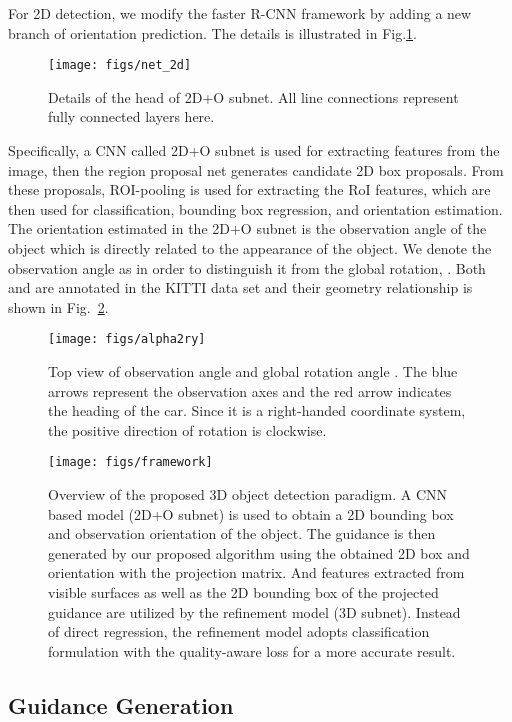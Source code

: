 \documentclass[10pt,twocolumn,letterpaper]{article}
\begin{document}
For 2D detection, we modify the faster R-CNN framework by adding a new branch of orientation prediction. 
The details is illustrated in Fig.\ref{fig:net_2d}.

\begin{figure}[!h]
\centering
\texttt{[image: figs/net\_2d]}
\caption{Details of the head of 2D+O subnet. All line connections represent fully connected layers here.}
\label{fig:net_2d}
\end{figure}

Specifically, a CNN called 2D+O subnet is used for extracting features from the image, then the region proposal net generates candidate 2D box proposals. From these proposals, ROI-pooling is used for extracting the RoI features, which are then used for classification, bounding box regression, and orientation estimation.
The orientation estimated in the 2D+O subnet is the observation angle of the object which is directly related to the appearance of the object. We denote the observation angle as  in order to distinguish it from the global rotation, . Both  and  are annotated in the KITTI data set and their geometry relationship is shown in Fig.~\ref{fig:alpha2ry}.  

\begin{figure}[!h]
\centering
\texttt{[image: figs/alpha2ry]}
\caption{Top view of observation angle  and global rotation angle . The blue arrows represent the observation axes and the red arrow indicates the heading of the car. Since it is a right-handed coordinate system, the positive direction of rotation is clockwise.}
\label{fig:alpha2ry}
\end{figure}

\begin{figure*}[!t]
\centering
\texttt{[image: figs/framework]}
\caption{Overview of the proposed 3D object detection paradigm. A CNN based model (2D+O subnet) is used to obtain a 2D bounding box and observation orientation of the object. The guidance is then generated by our proposed algorithm using the obtained 2D box and orientation with the projection matrix. And features extracted from visible surfaces as well as the 2D bounding box of the projected guidance are utilized by the refinement model (3D subnet). Instead of direct regression, the refinement model adopts classification formulation with the quality-aware loss for a more accurate result.}
\label{fig:framework}
\end{figure*}

\subsection{Guidance Generation}
\end{document}
